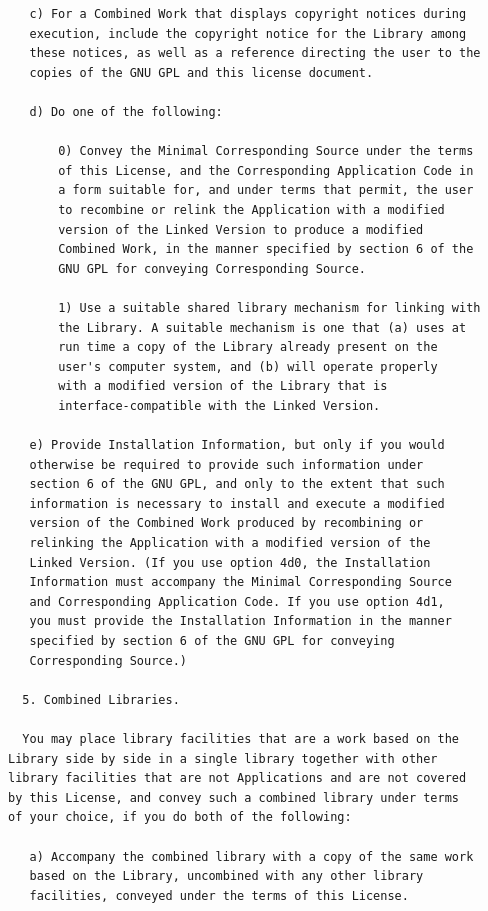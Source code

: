 \documentclass[11pt,twoside,fleqn,openright,titlepage]{cslreport}
\begin{document}
\begin{small}
\begin{verbatim}
   c) For a Combined Work that displays copyright notices during
   execution, include the copyright notice for the Library among
   these notices, as well as a reference directing the user to the
   copies of the GNU GPL and this license document.

   d) Do one of the following:

       0) Convey the Minimal Corresponding Source under the terms 
       of this License, and the Corresponding Application Code in
       a form suitable for, and under terms that permit, the user
       to recombine or relink the Application with a modified
       version of the Linked Version to produce a modified
       Combined Work, in the manner specified by section 6 of the
       GNU GPL for conveying Corresponding Source.

       1) Use a suitable shared library mechanism for linking with
       the Library. A suitable mechanism is one that (a) uses at
       run time a copy of the Library already present on the
       user's computer system, and (b) will operate properly
       with a modified version of the Library that is
       interface-compatible with the Linked Version.

   e) Provide Installation Information, but only if you would 
   otherwise be required to provide such information under
   section 6 of the GNU GPL, and only to the extent that such
   information is necessary to install and execute a modified
   version of the Combined Work produced by recombining or 
   relinking the Application with a modified version of the
   Linked Version. (If you use option 4d0, the Installation
   Information must accompany the Minimal Corresponding Source 
   and Corresponding Application Code. If you use option 4d1, 
   you must provide the Installation Information in the manner
   specified by section 6 of the GNU GPL for conveying
   Corresponding Source.)

  5. Combined Libraries.

  You may place library facilities that are a work based on the
Library side by side in a single library together with other
library facilities that are not Applications and are not covered
by this License, and convey such a combined library under terms
of your choice, if you do both of the following:

   a) Accompany the combined library with a copy of the same work
   based on the Library, uncombined with any other library 
   facilities, conveyed under the terms of this License.


\end{verbatim}
\end{small}
\end{document}
